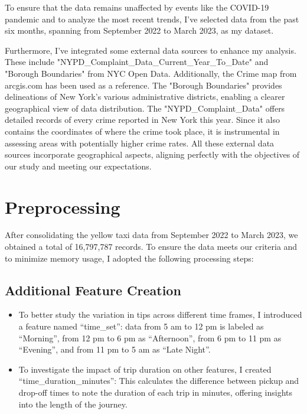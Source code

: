 \documentclass[11pt]{article}
\begin{document}
To ensure that the data remains unaffected by events like the COVID-19 pandemic and to analyze the most recent trends, I've selected data from the past six months, spanning from September 2022 to March 2023, as my dataset.

Furthermore, I've integrated some external data sources to enhance my analysis. These include "NYPD\_Complaint\_Data\_Current\_Year\_To\_Date"\cite{nypd} and "Borough Boundaries" \cite{boundary}from NYC Open Data. Additionally, the Crime map from arcgis.com\cite{map} has been used as a reference.
The "Borough Boundaries" provides delineations of New York's various administrative districts, enabling a clearer geographical view of data distribution. The "NYPD\_Complaint\_Data" offers detailed records of every crime reported in New York this year. Since it also contains the coordinates of where the crime took place, it is instrumental in assessing areas with potentially higher crime rates.
All these external data sources incorporate geographical aspects, aligning perfectly with the objectives of our study and meeting our expectations.




\section{Preprocessing}
After consolidating the yellow taxi data from September 2022 to March 2023, we obtained a total of 16,797,787 records. To ensure the data meets our criteria and to minimize memory usage, I adopted the following processing steps:

\subsection{Additional Feature Creation}

\begin{itemize} 
    \item To better study the variation in tips across different time frames, I introduced a feature named “time\_set”: data from 5 am to 12 pm is labeled as “Morning”, from 12 pm to 6 pm as “Afternoon”, from 6 pm to 11 pm as “Evening”, and from 11 pm to 5 am as “Late Night”.
\end{itemize} 

\begin{itemize} 
    \item To investigate the impact of trip duration on other features, I created “time\_duration\_minutes”: This calculates the difference between pickup and drop-off times to note the duration of each trip in minutes, offering insights into the length of the journey.
\end{itemize} 
\end{document}
